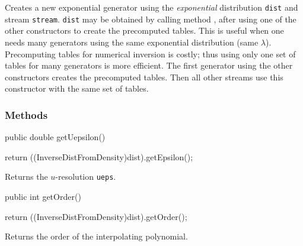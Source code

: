  \begin{tabb}  Creates a new exponential generator using the \emph{exponential}
   distribution \texttt{dist} and stream \texttt{stream}. \texttt{dist}
   may be obtained by calling method ,
   after using one of the other constructors to create the 
   precomputed tables. This is useful when one needs many   generators 
 using the same exponential distribution
(same $\lambda$). Precomputing tables for numerical inversion is
 costly; thus using only one set of tables for many generators 
is more efficient. The first  generator 
 using the other constructors creates the precomputed tables.
Then all other streams use this constructor with the same set of tables.
\end{tabb}


\subsubsection* {Methods}
\begin{code}

   public double getUepsilon()\begin{hide} {
      return ((InverseDistFromDensity)dist).getEpsilon();
   }
\end{hide}
\end{code}
\begin{tabb}
   Returns the $u$-resolution \texttt{ueps}.
\end{tabb}
\begin{code}

   public int getOrder()\begin{hide} {
      return ((InverseDistFromDensity)dist).getOrder();
   }
\end{hide}
\end{code}
\begin{tabb}
   Returns the order of the interpolating polynomial.
\end{tabb}

\begin{hide}
\begin{code}
}\end{code}
\end{hide}
